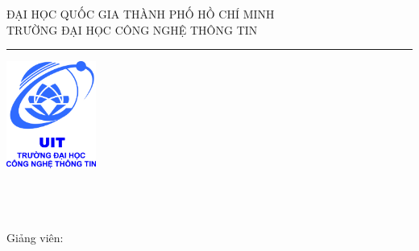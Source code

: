 \begin{titlepage}
    \begin{center}

        \Large{
            ĐẠI HỌC QUỐC GIA THÀNH PHỐ HỒ CHÍ MINH\\
            TRƯỜNG ĐẠI HỌC CÔNG NGHỆ THÔNG TIN\\
        }
        \vspace{0.3cm}
        \rule[0.5cm]{15.8cm}{0.6mm}

        \vspace{0.3cm}
        \includegraphics[width=0.22\textwidth]{anh/LogoUIT}\\

        \vfill
        \Huge\textbf
            \TenBai\\
        \vspace{0.3cm}
        \LARGE
            \TenNhom\\
        \vfill
        
        \CacThanhVienTrongNhom
        \vspace{0.5cm}\\
        \normalsize{Giảng viên: }\NguoiHuongDan
    \end{center}
\end{titlepage}